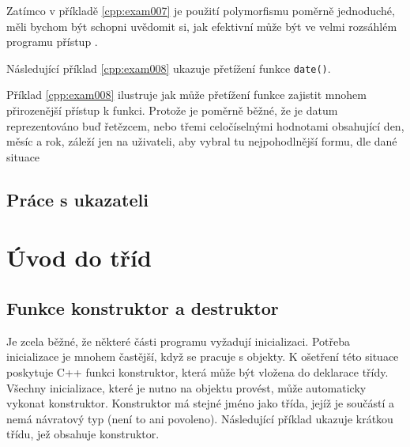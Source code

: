       Zatímco v příkladě \ref{cpp:exam007} je použití polymorfismu poměrně jednoduché, měli bychom
      být schopni uvědomit si, jak efektivní může být ve velmi rozsáhlém programu přístup . 

      Následující příklad \ref{cpp:exam008} ukazuje přetížení funkce
      \lstinline[style=luaCPPText]!date()!.
      
    
      Příklad \ref{cpp:exam008} ilustruje jak může přetížení funkce zajistit mnohem při\-rozenější
      přístup k funkci. Protože je poměrně běžné, že je datum reprezentováno buď řetězcem, nebo
      třemi celočíselnými hodnotami obsahující den, měsíc a rok, záleží jen na uživateli, aby vybral
      tu nejpohodlnější formu, dle dané situace
  
    \subsection{Práce s ukazateli} 
      
      
      
      

      
  
  
  
  \section{Úvod do tříd}  
    \subsection{Funkce konstruktor a destruktor}
      Je zcela běžné, že některé části programu vyžadují inicializaci. Potřeba inicializace je 
      mnohem častější, když se pracuje s objekty. K ošetření této situace poskytuje C++ funkci 
      konstruktor, která může být vložena do deklarace třídy. Všechny inicializace, které je nutno 
      na objektu provést, může automaticky vykonat konstruktor. Konstruktor má stejné jméno jako 
      třída, jejíž je součástí a nemá návratový typ (není to ani povoleno). Následující příklad 
      ukazuje krátkou třídu, jež obsahuje konstruktor.
  
